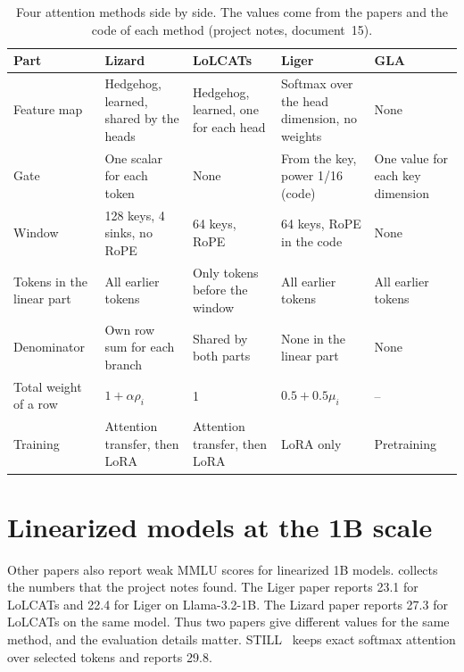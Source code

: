 \begin{table}[ht]
\centering
\small
\caption[Four attention methods side by side]{Four attention methods side by side. The values come from the papers and the code of each method (project notes, document~15).}
\label{tab:methods}
\begin{tabularx}{\linewidth}{@{}lLLLL@{}}
\toprule
Part & Lizard & LoLCATs & Liger & GLA \\
\midrule
Feature map & Hedgehog, learned, shared by the heads & Hedgehog, learned, one for each head & Softmax over the head dimension, no weights & None \\
Gate & One scalar for each token & None & From the key, power 1/16 (code) & One value for each key dimension \\
Window & 128 keys, 4 sinks, no RoPE & 64 keys, RoPE & 64 keys, RoPE in the code & None \\
Tokens in the linear part & All earlier tokens & Only tokens before the window & All earlier tokens & All earlier tokens \\
Denominator & Own row sum for each branch & Shared by both parts & None in the linear part & None \\
Total weight of a row & $1 + \alpha\rho_i$ & 1 & $0.5 + 0.5\mu_i$ & -- \\
Training & Attention transfer, then LoRA & Attention transfer, then LoRA & LoRA only & Pretraining \\
\bottomrule
\end{tabularx}
\end{table}

\section{Linearized models at the 1B scale}
\label{sec:rw-1b}

Other papers also report weak MMLU scores for linearized 1B models.  collects the numbers that the project notes found. The Liger paper reports 23.1 for LoLCATs and 22.4 for Liger on Llama-3.2-1B. The Lizard paper reports 27.3 for LoLCATs on the same model. Thus two papers give different values for the same method, and the evaluation details matter. STILL~\cite{still} keeps exact softmax attention over selected tokens and reports 29.8.

